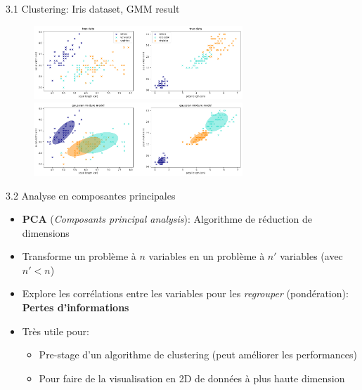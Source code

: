 \begin{frame}{3.1 Clustering: Iris dataset, GMM result}
  \begin{figure}
    \includegraphics[width=0.7\textwidth]{figs/clusteringTrue.png}
    \includegraphics[width=0.7\textwidth]{figs/clusteringGMM.png}
  \end{figure}
\end{frame}

\begin{frame}{3.2 Analyse en composantes principales}
  \begin{itemize}
  \item \textbf{PCA} (\textit{Composants principal analysis}): Algorithme de réduction de dimensions
  \item Transforme un problème à $n$ variables en un problème à $n'$ variables (avec $n' < n$)
  \item Explore les corrélations entre les variables pour les \textit{regrouper} (pondération): \textbf{Pertes d'informations}
  \item Très utile pour:
    \begin{itemize}
      \normalsize
    \item Pre-stage d'un algorithme de clustering (peut améliorer les performances)
    \item Pour faire de la visualisation en 2D de données à plus haute dimension
    \end{itemize}
  \end{itemize}
\end{frame}

